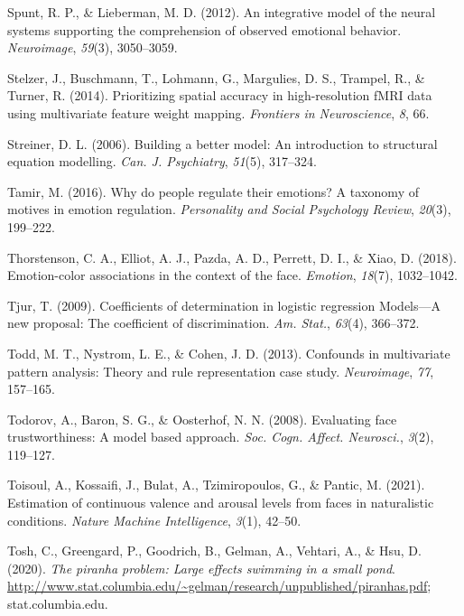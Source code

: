 \documentclass[11pt,american,a4paper,oneside,]{memoir} %
\begin{document}
\leavevmode\hypertarget{ref-spunt2012integrative}{}%
Spunt, R. P., \& Lieberman, M. D. (2012). An integrative model of the neural systems supporting the comprehension of observed emotional behavior. \emph{Neuroimage}, \emph{59}(3), 3050--3059.

\leavevmode\hypertarget{ref-stelzer2014prioritizing}{}%
Stelzer, J., Buschmann, T., Lohmann, G., Margulies, D. S., Trampel, R., \& Turner, R. (2014). Prioritizing spatial accuracy in high-resolution fMRI data using multivariate feature weight mapping. \emph{Frontiers in Neuroscience}, \emph{8}, 66.

\leavevmode\hypertarget{ref-Streiner2006-ze}{}%
Streiner, D. L. (2006). Building a better model: An introduction to structural equation modelling. \emph{Can. J. Psychiatry}, \emph{51}(5), 317--324.

\leavevmode\hypertarget{ref-tamir2016people}{}%
Tamir, M. (2016). Why do people regulate their emotions? A taxonomy of motives in emotion regulation. \emph{Personality and Social Psychology Review}, \emph{20}(3), 199--222.

\leavevmode\hypertarget{ref-Thorstenson2018-io}{}%
Thorstenson, C. A., Elliot, A. J., Pazda, A. D., Perrett, D. I., \& Xiao, D. (2018). Emotion-color associations in the context of the face. \emph{Emotion}, \emph{18}(7), 1032--1042.

\leavevmode\hypertarget{ref-Tjur2009-dp}{}%
Tjur, T. (2009). Coefficients of determination in logistic regression Models---A new proposal: The coefficient of discrimination. \emph{Am. Stat.}, \emph{63}(4), 366--372.

\leavevmode\hypertarget{ref-Todd2013-sd}{}%
Todd, M. T., Nystrom, L. E., \& Cohen, J. D. (2013). Confounds in multivariate pattern analysis: Theory and rule representation case study. \emph{Neuroimage}, \emph{77}, 157--165.

\leavevmode\hypertarget{ref-Todorov2008-eb}{}%
Todorov, A., Baron, S. G., \& Oosterhof, N. N. (2008). Evaluating face trustworthiness: A model based approach. \emph{Soc. Cogn. Affect. Neurosci.}, \emph{3}(2), 119--127.

\leavevmode\hypertarget{ref-Toisoul2021-yc}{}%
Toisoul, A., Kossaifi, J., Bulat, A., Tzimiropoulos, G., \& Pantic, M. (2021). Estimation of continuous valence and arousal levels from faces in naturalistic conditions. \emph{Nature Machine Intelligence}, \emph{3}(1), 42--50.

\leavevmode\hypertarget{ref-Tosh2020-sf}{}%
Tosh, C., Greengard, P., Goodrich, B., Gelman, A., Vehtari, A., \& Hsu, D. (2020). \emph{The piranha problem: Large effects swimming in a small pond}. \url{http://www.stat.columbia.edu/~gelman/research/unpublished/piranhas.pdf}; stat.columbia.edu.
\end{document}
